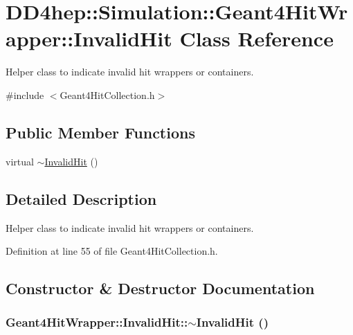 \hypertarget{class_d_d4hep_1_1_simulation_1_1_geant4_hit_wrapper_1_1_invalid_hit}{
\section{DD4hep::Simulation::Geant4HitWrapper::InvalidHit Class Reference}
\label{class_d_d4hep_1_1_simulation_1_1_geant4_hit_wrapper_1_1_invalid_hit}
}


Helper class to indicate invalid hit wrappers or containers.  


{\ttfamily \#include $<$Geant4HitCollection.h$>$}\subsection*{Public Member Functions}
\begin{DoxyCompactItemize}
\item 
virtual \hyperlink{class_d_d4hep_1_1_simulation_1_1_geant4_hit_wrapper_1_1_invalid_hit_aa4c520e4b27309eb6423b301b73608a4}{$\sim$InvalidHit} ()
\end{DoxyCompactItemize}


\subsection{Detailed Description}
Helper class to indicate invalid hit wrappers or containers. 

Definition at line 55 of file Geant4HitCollection.h.

\subsection{Constructor \& Destructor Documentation}
\hypertarget{class_d_d4hep_1_1_simulation_1_1_geant4_hit_wrapper_1_1_invalid_hit_aa4c520e4b27309eb6423b301b73608a4}{
\subsubsection[{$\sim$InvalidHit}]{\setlength{\rightskip}{0pt plus 5cm}Geant4HitWrapper::InvalidHit::$\sim$InvalidHit ()}}
\label{class_d_d4hep_1_1_simulation_1_1_geant4_hit_wrapper_1_1_invalid_hit_aa4c520e4b27309eb6423b301b73608a4}


